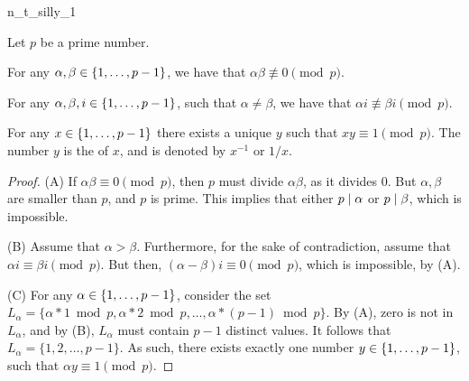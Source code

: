 \begin{fragment}{n_t_silly_1}
    \begin{lemma}
        Let $p$ be a prime number.
        \begin{compactenumA}
            \item For any $\alpha, \beta \in \left\{ { 1, \ldots, p-1} \right\}$,
            we have that $\alpha \beta \not \equiv 0 \pmod{p}$.
            
            \item For any $\alpha, \beta, i \in \left\{ { 1,\ldots, p-1} \right\}$,
            such that $\alpha \ne \beta$, we have that
            $\alpha i \nequiv \beta i \pmod{p}$.
            
            
            \item For any $x \in \left\{ {1,\ldots, p-1} \right\}$ there exists a
            unique $y$ such that $xy \equiv 1 \pmod{p}$. The number
            $y$ is the  of $x$, and is denoted by
            $x^{-1}$ or $1/x$.
        \end{compactenumA}
    \end{lemma}
\end{fragment}
\begin{proof}
    (A) If $\alpha \beta \equiv 0 \pmod{p}$, then $p$ must divide
    $\alpha \beta$, as it divides $0$. But $\alpha, \beta$ are smaller
    than $p$, and $p$ is prime. This implies that either
    $p \mid \alpha$ or $p \mid \beta$, which is impossible.
    
    \smallskip%
    (B) Assume that $\alpha > \beta$. Furthermore, for the sake of
    contradiction, assume that $\alpha i \equiv \beta i \pmod{p}$. But
    then, $(\alpha - \beta) i \equiv 0 \pmod{p}$, which is impossible,
    by (A).

    \smallskip%
    (C) For any $\alpha \in \left\{ { 1,\ldots, p-1} \right\}$, consider the set
    \begin{math}
        L_\alpha = \{\alpha *1 \bmod p, \alpha *2 \bmod p, \ldots,
        \alpha *(p-1) \bmod p\}.
    \end{math}
    By (A), zero is not in $L_\alpha$, and by (B), $L_\alpha$ must
    contain $p-1$ distinct values. It follows that
    $L_\alpha = \{1,2, \ldots, p-1\}$. As such, there exists exactly
    one number $y \in \left\{ {1,\ldots, p-1} \right\}$, such that
    $\alpha y \equiv 1 \pmod{p}$.
\end{proof}


